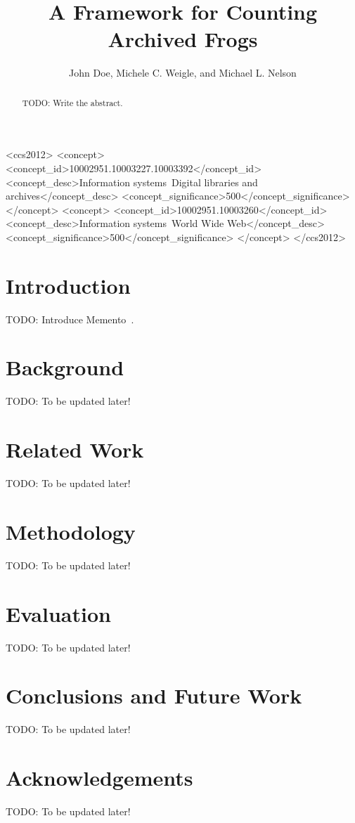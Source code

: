 \documentclass[sigconf]{acmart}
\newcommand{\todo}[1][To be updated later!]{{\color{red} TODO: {#1}}}
\begin{document}
\title{A Framework for Counting Archived Frogs}

\author{John Doe, Michele C. Weigle, and Michael L. Nelson}

\renewcommand{\shortauthors}{J. Doe et al.}


\begin{abstract}
\todo[Write the abstract.]
\end{abstract}


\begin{CCSXML}
<ccs2012>
<concept>
<concept_id>10002951.10003227.10003392</concept_id>
<concept_desc>Information systems~Digital libraries and archives</concept_desc>
<concept_significance>500</concept_significance>
</concept>
<concept>
<concept_id>10002951.10003260</concept_id>
<concept_desc>Information systems~World Wide Web</concept_desc>
<concept_significance>500</concept_significance>
</concept>
</ccs2012>
\end{CCSXML}




\maketitle


\section{Introduction}

\todo[Introduce Memento~\cite{memento:rfc}.]


\section{Background}

\todo


\section{Related Work}

\todo


\section{Methodology}

\todo


\section{Evaluation}

\todo


\section{Conclusions and Future Work}

\todo


\section{Acknowledgements}

\todo



 
\end{document}
